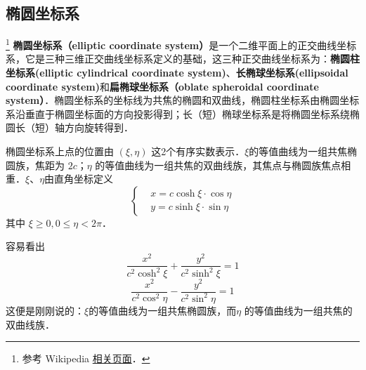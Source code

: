 
\begin{issues}
\issueDraft
\end{issues}


\subsection{椭圆坐标系}
\footnote{参考 Wikipedia \href{https://en.wikipedia.org/wiki/Elliptic_coordinate_system}{相关页面}．}
\textbf{椭圆坐标系（elliptic coordinate system）}是一个二维平面上的正交曲线坐标系，它是三种三维正交曲线坐标系定义的基础，这三种正交曲线坐标系为：\textbf{椭圆柱坐标系(elliptic cylindrical coordinate system)}、\textbf{长椭球坐标系(ellipsoidal coordinate system)}和\textbf{扁椭球坐标系（oblate spheroidal coordinate system）}．椭圆坐标系的坐标线为共焦的椭圆和双曲线，椭圆柱坐标系由椭圆坐标系沿垂直于椭圆坐标面的方向投影得到；长（短）椭球坐标系是将椭圆坐标系绕椭圆长（短）轴方向旋转得到．

椭圆坐标系上点的位置由 $(\xi,\eta)$ 这2个有序实数表示．$\xi$的等值曲线为一组共焦椭圆族，焦距为 $2c$；$\eta$ 的等值曲线为一组共焦的双曲线族，其焦点与椭圆族焦点相重．$\xi$、$\eta$由直角坐标定义
\begin{equation}\label{EliCor_eq3}
\left\{\begin{aligned}
&x=c\cosh\xi\cdot\cos\eta\\
&y=c\sinh\xi\cdot\sin\eta
\end{aligned}\right.
\end{equation}
其中 $\xi\geq0,0\leq\eta<2\pi$．

容易看出
\begin{equation}\label{EliCor_eq4}
\frac{x^2}{c^2\cosh^2\xi}+\frac{y^2}{c^2\sinh^2\xi}=1
\end{equation}
\begin{equation}\label{EliCor_eq5}
\frac{x^2}{c^2\cos^2\eta}-\frac{y^2}{c^2\sin^2\eta}=1
\end{equation}
这便是刚刚说的：$\xi$的等值曲线为一组共焦椭圆族，而$\eta$ 的等值曲线为一组共焦的双曲线族．

